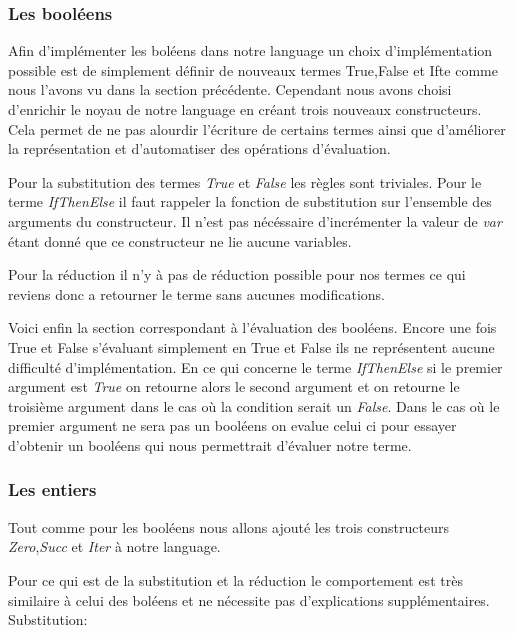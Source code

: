 \documentclass {article}
\newcommand{\codefrom}[3]
           {}
\theoremstyle{definition}
\theoremstyle{remark}
\begin{document}
\subsubsection{Les booléens}
Afin d'implémenter les boléens dans notre language un choix d'implémentation 
possible est de simplement définir de nouveaux termes True,False et Ifte
comme nous l'avons vu dans la section précédente. Cependant nous avons choisi 
d'enrichir le noyau de notre language en créant trois nouveaux constructeurs.
Cela permet de ne pas alourdir l'écriture de certains termes ainsi que 
d'améliorer la représentation et d'automatiser des opérations d'évaluation.

\codefrom{untyped}{lambda}{bool_term}

Pour la substitution des termes \emph{True} et \emph{False} les règles 
sont triviales. Pour le terme \emph{IfThenElse} il faut rappeler la 
fonction de substitution sur l'ensemble des arguments du constructeur.
Il n'est pas nécéssaire d'incrémenter la valeur de \emph{var} étant donné
que ce constructeur ne lie aucune variables.

\codefrom{untyped}{lambda}{bool_substitution}

Pour la réduction il n'y à pas de réduction possible pour nos termes
ce qui reviens donc a retourner le terme sans aucunes modifications.


Voici enfin la section correspondant à l'évaluation des booléens.
Encore une fois True et False s'évaluant simplement en True et False ils
ne représentent aucune difficulté d'implémentation. En ce qui concerne
le terme \emph{IfThenElse} si le premier argument est \emph{True}
on retourne alors le second argument et on retourne le troisième argument 
dans le cas où la condition serait un \emph{False}. Dans le cas 
où le premier argument ne sera pas un booléens on evalue celui ci pour 
essayer d'obtenir un booléens qui nous permettrait d'évaluer notre 
terme.

\codefrom{untyped}{lambda}{bool_evaluation}


\subsubsection{Les entiers}

Tout comme pour les booléens nous allons ajouté les trois constructeurs 
\emph{Zero},\emph{Succ} et \emph{Iter} à notre language.

\codefrom{untyped}{lambda}{nat_term}

Pour ce qui est de la substitution et la réduction le comportement est très
similaire à celui des boléens et ne nécessite pas d'explications supplémentaires.
Substitution:
\end{document}
